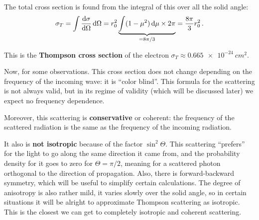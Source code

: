 \documentclass[main.tex]{subfiles}
\begin{document}
The total cross section is found from the integral of this over all the solid angle: 
%
\begin{align}
\sigma_T = \int \dv{\sigma }{\Omega } \dd{\Omega } = r_0^2 \underbrace{\int (1 - \mu^2) \dd{\mu } \times 2 \pi }_{= 8 \pi /3} = \frac{8 \pi }{3} r_0^2
\,.
\end{align}

This is the \textbf{Thompson cross section} of the electron \(\sigma_{T} \approx \SI{0.665e-24}{cm^2}\). 

Now, for some observations. This cross section does not change depending on the frequency of the incoming wave: it is ``color blind''.
This formula for the scattering is not always valid, but in its regime of validity (which will be discussed later) we expect no frequency dependence. 

Moreover, this scattering is \textbf{conservative} or coherent: the frequency of the scattered radiation is the same as the frequency of the incoming radiation.

It also is \textbf{not isotropic} because of the factor \(\sin^2 \Theta \). This scattering ``prefers'' for the light to go along the same direction it came from, and the probability density for it goes to zero for  \(\Theta = \pi /2\), meaning for a scattered photon orthogonal to the direction of propagation. 
Also, there is forward-backward symmetry, which will be useful to simplify certain calculations.
The degree of anisotropy is also rather mild, it varies slowly over the solid angle, so in certain situations it will be alright to approximate Thompson scattering as isotropic.
This is the closest we can get to completely isotropic and coherent scattering. 
\end{document}
